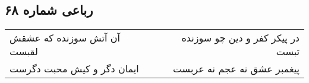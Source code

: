 \begin{center}
\section*{رباعی شماره ۶۸}
\label{sec:sh068}
\begin{longtable}{l p{0.5cm} r}
آن آتش سوزنده که عشقش لقبست
&&
در پیکر کفر و دین چو سوزنده تبست
\\
ایمان دگر و کیش محبت دگرست
&&
پیغمبر عشق نه عجم نه عربست
\\
\end{longtable}
\end{center}
